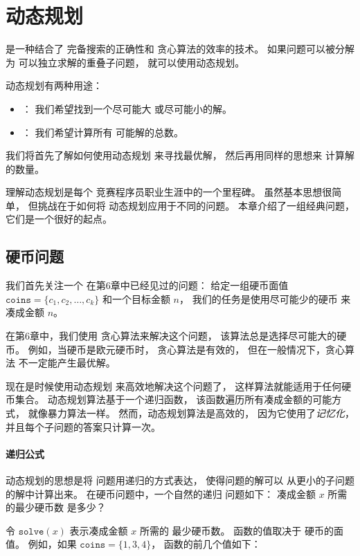 \chapter{动态规划}


是一种结合了
完备搜索的正确性和
贪心算法的效率的技术。
如果问题可以被分解为
可以独立求解的重叠子问题，
就可以使用动态规划。

动态规划有两种用途：

\begin{itemize}
\item
{}：
我们希望找到一个尽可能大
或尽可能小的解。
\item
{}：
我们希望计算所有
可能解的总数。
\end{itemize}

我们将首先了解如何使用动态规划
来寻找最优解，
然后再用同样的思想来
计算解的数量。

理解动态规划是每个
竞赛程序员职业生涯中的一个里程碑。
虽然基本思想很简单，
但挑战在于如何将
动态规划应用于不同的问题。
本章介绍了一组经典问题，
它们是一个很好的起点。

\section{硬币问题}

我们首先关注一个
在第6章中已经见过的问题：
给定一组硬币面值 $\texttt{coins} = \{c_1,c_2,\ldots,c_k\}$
和一个目标金额 $n$，
我们的任务是使用尽可能少的硬币
来凑成金额 $n$。

在第6章中，我们使用
贪心算法来解决这个问题，
该算法总是选择尽可能大的硬币。
例如，当硬币是欧元硬币时，
贪心算法是有效的，
但在一般情况下，贪心算法
不一定能产生最优解。

现在是时候使用动态规划
来高效地解决这个问题了，
这样算法就能适用于任何硬币集合。
动态规划算法基于一个递归函数，
该函数遍历所有凑成金额的可能方式，
就像暴力算法一样。
然而，动态规划算法是高效的，
因为它使用了\emph{记忆化}，
并且每个子问题的答案只计算一次。

\subsubsection{递归公式}

动态规划的思想是将
问题用递归的方式表达，
使得问题的解可以
从更小的子问题的解中计算出来。
在硬币问题中，一个自然的递归
问题如下：
凑成金额 $x$ 所需的最少硬币数
是多少？

令 $\texttt{solve}(x)$
表示凑成金额 $x$ 所需的
最少硬币数。
函数的值取决于
硬币的面值。
例如，如果 $\texttt{coins} = \{1,3,4\}$，
函数的前几个值如下：

